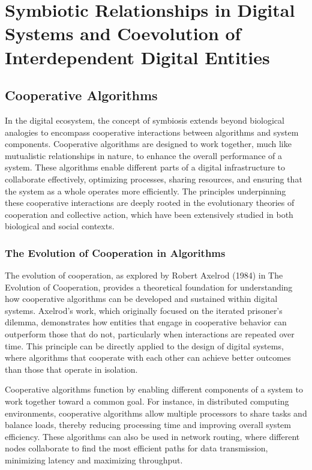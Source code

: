 \documentclass[12pt,twoside]{article}
\begin{document}
\section{Symbiotic Relationships in Digital Systems and Coevolution of Interdependent Digital Entities}

\subsection{Cooperative Algorithms}

In the digital ecosystem, the concept of symbiosis extends beyond biological analogies to encompass cooperative interactions between algorithms and system components. Cooperative algorithms are designed to work together, much like mutualistic relationships in nature, to enhance the overall performance of a system. These algorithms enable different parts of a digital infrastructure to collaborate effectively, optimizing processes, sharing resources, and ensuring that the system as a whole operates more efficiently. The principles underpinning these cooperative interactions are deeply rooted in the evolutionary theories of cooperation and collective action, which have been extensively studied in both biological and social contexts.

\subsubsection{The Evolution of Cooperation in Algorithms}

The evolution of cooperation, as explored by Robert Axelrod (1984) in The Evolution of Cooperation, provides a theoretical foundation for understanding how cooperative algorithms can be developed and sustained within digital systems. Axelrod's work, which originally focused on the iterated prisoner’s dilemma, demonstrates how entities that engage in cooperative behavior can outperform those that do not, particularly when interactions are repeated over time. This principle can be directly applied to the design of digital systems, where algorithms that cooperate with each other can achieve better outcomes than those that operate in isolation.

Cooperative algorithms function by enabling different components of a system to work together toward a common goal. For instance, in distributed computing environments, cooperative algorithms allow multiple processors to share tasks and balance loads, thereby reducing processing time and improving overall system efficiency. These algorithms can also be used in network routing, where different nodes collaborate to find the most efficient paths for data transmission, minimizing latency and maximizing throughput.
\end{document}
